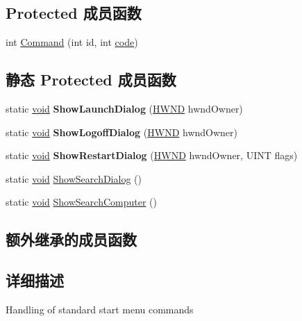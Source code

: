 \subsection*{Protected 成员函数}
\begin{DoxyCompactItemize}
\item 
int \hyperlink{struct_start_menu_handler_acf21227ba5f3d16659873efd2630a200}{Command} (int id, int \hyperlink{structcode}{code})
\end{DoxyCompactItemize}
\subsection*{静态 Protected 成员函数}
\begin{DoxyCompactItemize}
\item 
\mbox{\label{struct_start_menu_handler_a11ad824ff1f1bd68b9389be099f72c0f}} 
static \hyperlink{interfacevoid}{void} {\bfseries Show\+Launch\+Dialog} (\hyperlink{interfacevoid}{H\+W\+ND} hwnd\+Owner)
\item 
\mbox{\label{struct_start_menu_handler_aee7132a41eeae31116125ae4c13de7d3}} 
static \hyperlink{interfacevoid}{void} {\bfseries Show\+Logoff\+Dialog} (\hyperlink{interfacevoid}{H\+W\+ND} hwnd\+Owner)
\item 
\mbox{\label{struct_start_menu_handler_a3b89c31d025d129467522bd8bf2a178b}} 
static \hyperlink{interfacevoid}{void} {\bfseries Show\+Restart\+Dialog} (\hyperlink{interfacevoid}{H\+W\+ND} hwnd\+Owner, U\+I\+NT flags)
\item 
static \hyperlink{interfacevoid}{void} \hyperlink{struct_start_menu_handler_ac06629f59aa85cbaf1b5adfbc62ff124}{Show\+Search\+Dialog} ()
\item 
static \hyperlink{interfacevoid}{void} \hyperlink{struct_start_menu_handler_a7ebc2b808763f6ad884ad8d5b03b6069}{Show\+Search\+Computer} ()
\end{DoxyCompactItemize}
\subsection*{额外继承的成员函数}


\subsection{详细描述}
Handling of standard start menu commands 

